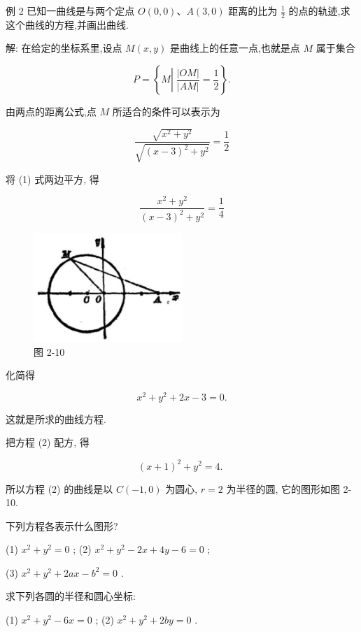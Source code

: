 \documentclass[lang=cn,newtx,10pt,scheme=chinese]{elegantbook}
\begin{document}
例 2 已知一曲线是与两个定点 \(O\left( {0,0}\right) \text{、}A\left( {3,0}\right)\) 距离的比为 \(\frac{1}{2}\) 的点的轨迹,求这个曲线的方程,并画出曲线.

解: 在给定的坐标系里,设点 \(M\left( {x,y}\right)\) 是曲线上的任意一点,也就是点 \(M\) 属于集合

\[
  P = \left\{ {M\left| {\;\frac{\left| OM\right| }{\left| AM\right| } = \frac{1}{2}}\right. }\right\} .
\]

由两点的距离公式,点 \(M\) 所适合的条件可以表示为

\[
  \frac{\sqrt{{x}^{2} + {y}^{2}}}{\sqrt{{\left( x - 3\right) }^{2} + {y}^{2}}} = \frac{1}{2} \tag{1}
\]

将 (1) 式两边平方, 得

\[
  \frac{{x}^{2} + {y}^{2}}{{\left( x - 3\right) }^{2} + {y}^{2}} = \frac{1}{4}
\]

\begin{figure}[h]
  \centering
  \includegraphics[max width=0.5\textwidth]{images/01912cc2-ffb6-728e-9ae7-b113ff05c64b_84_125563.jpg}
  \caption{图 2-10}
\end{figure}



化简得

\[
    {x}^{2} + {y}^{2} + {2x} - 3 = 0. \tag{2}
\]

这就是所求的曲线方程.

把方程 (2) 配方, 得

\[
    {\left( x + 1\right) }^{2} + {y}^{2} = 4\text{. }
\]

所以方程 (2) 的曲线是以 \(C\left( {-1,0}\right)\) 为圆心, \(r = 2\) 为半径的圆, 它的图形如图 2-10.

\begin{problemset}[练习]

\item 下列方程各表示什么图形?

(1) \({x}^{2} + {y}^{2} = 0\) ; (2) \({x}^{2} + {y}^{2} - {2x} + {4y} - 6 = 0\) ;

(3) \({x}^{2} + {y}^{2} + {2ax} - {b}^{2} = 0\) .

\item 求下列各圆的半径和圆心坐标:

(1) \({x}^{2} + {y}^{2} - {6x} = 0\) ; (2) \({x}^{2} + {y}^{2} + {2by} = 0\) .
\end{problemset}
\end{document}

